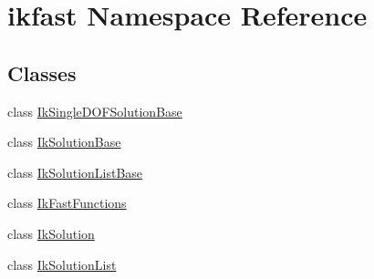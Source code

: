 \hypertarget{namespaceikfast}{\section{ikfast Namespace Reference}
\label{namespaceikfast}
}
\subsection*{Classes}
\begin{DoxyCompactItemize}
\item 
class \hyperlink{classikfast_1_1IkSingleDOFSolutionBase}{Ik\-Single\-D\-O\-F\-Solution\-Base}
\item 
class \hyperlink{classikfast_1_1IkSolutionBase}{Ik\-Solution\-Base}
\item 
class \hyperlink{classikfast_1_1IkSolutionListBase}{Ik\-Solution\-List\-Base}
\item 
class \hyperlink{classikfast_1_1IkFastFunctions}{Ik\-Fast\-Functions}
\item 
class \hyperlink{classikfast_1_1IkSolution}{Ik\-Solution}
\item 
class \hyperlink{classikfast_1_1IkSolutionList}{Ik\-Solution\-List}
\end{DoxyCompactItemize}
